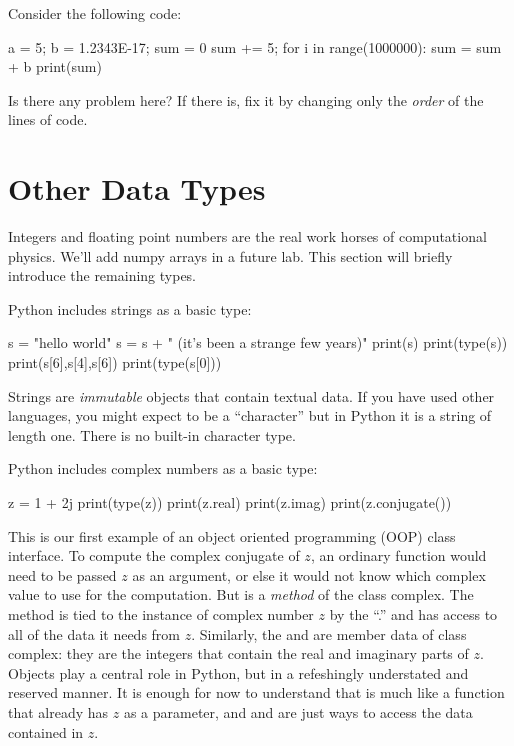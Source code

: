 \plot Consider the following code:
\begin{python}
a = 5;
b = 1.2343E-17;
sum = 0
sum += 5;
for i in range(1000000):
    sum = sum + b
print(sum)
\end{python}
Is there any problem here?  If there is, fix it by changing only the {\em order} of the lines of code.


\section{Other Data Types}

Integers and floating point numbers are the real work horses of
computational physics.  We'll add numpy arrays in a future lab.  This
section will briefly introduce the remaining types.

Python includes strings as a basic type:
\begin{python}
s = "hello world"
s = s + " (it's been a strange few years)"
print(s)
print(type(s))
print(s[6],s[4],s[6])
print(type(s[0]))
\end{python}
Strings are {\em immutable} objects that contain textual data.  If you
have used other languages, you might expect  to be a
``character'' but in Python it is a string of length one.  There is no
built-in character type.

Python includes complex numbers as a basic type:
\begin{python}
  z = 1 + 2j
  print(type(z))
  print(z.real)
  print(z.imag)
  print(z.conjugate())
\end{python}
This is our first example of an object oriented programming (OOP)
class interface.  To compute the complex conjugate of $z$, an ordinary
function would need to be passed $z$ as an argument, or else it would
not know which complex value to use for the computation.  But
 is a {\em method} of the class complex.  The
method is tied to the instance of complex number $z$ by the ``.'' and
has access to all of the data it needs from $z$.  Similarly,
the  and  are member data of class complex: they
are the integers that contain the real and imaginary parts of $z$.
Objects play a central role in Python, but in a refeshingly
understated and reserved manner.  It is enough for now to understand
that  is much like a function that already has $z$
as a parameter, and  and  are just ways to
access the data contained in $z$.\\

